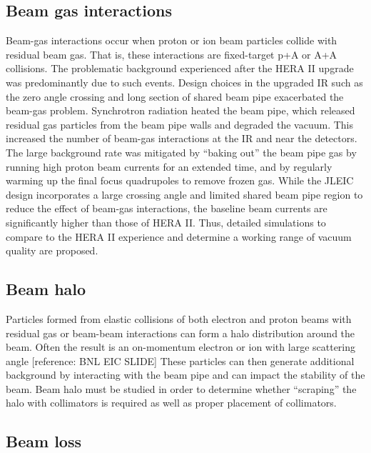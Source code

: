 \subsection{Beam gas interactions}

Beam-gas interactions occur when proton or ion beam particles collide with residual beam gas.  That is, these interactions are fixed-target p+A or A+A collisions.  The problematic background experienced after the HERA II upgrade was predominantly due to such events.  Design choices in the upgraded IR such as the zero angle crossing and long section of shared beam pipe exacerbated the beam-gas problem.  Synchrotron radiation heated the beam pipe, which released residual gas particles from the beam pipe walls and degraded the vacuum.  This increased the number of beam-gas interactions at the IR and near the detectors.  The large background rate was mitigated by “baking out” the beam pipe gas by running high proton beam currents for an extended time, and by regularly warming up the final focus quadrupoles to remove frozen gas.  
While the JLEIC design incorporates a large crossing angle and limited shared beam pipe region to reduce the effect of beam-gas interactions, the baseline beam currents are significantly higher than those of HERA II.  Thus, detailed simulations to compare to the HERA II experience and determine a working range of vacuum quality are proposed. 

\subsection{Beam halo}

Particles formed from elastic collisions of both electron and proton beams with residual gas or beam-beam interactions can form a halo distribution around the beam.  Often the result is an on-momentum electron or ion with large scattering angle [reference: BNL EIC SLIDE] These particles can then generate additional background by interacting with the beam pipe and can impact the stability of the beam.  Beam halo must be studied in order to determine whether “scraping” the halo with collimators is required as well as proper placement of collimators.

\subsection{Beam loss}

